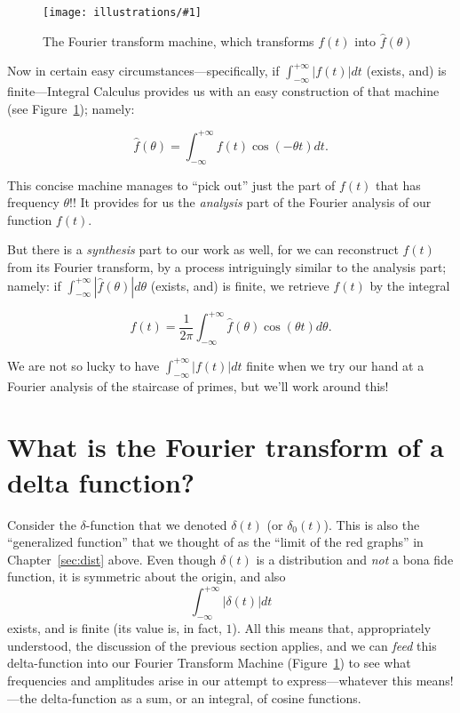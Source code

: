 \documentclass[openany]{book}
\newcommand{\ill}[3]{%
   \begin{figure}[H]%
   \vspace{-2ex}
   \centering%
   \texttt{[image: illustrations/\#1]}%
   \caption{#3}%
   \vspace{-2ex}
    \end{figure}}
\theoremstyle{plain}
\theoremstyle{definition}
\begin{document}
{\ill{fourier_machine}{.6}{The Fourier transform machine, which transforms $f(t)$ into ${\hat f}(\theta)$\label{fig:fourier_machine}}


Now in certain easy circumstances---specifically, if
$\int_{-{\infty}}^{+{\infty}}|f(t)|dt$ (exists, and)
is finite---Integral Calculus provides us with an easy construction of that
machine (see Figure~\ref{fig:fourier_machine}); namely:

    $${\hat f}(\theta) = \int_{-{\infty}}^{+{\infty}}f(t)\cos(-\theta t)dt.$$


    This concise machine manages to ``pick out'' just the part of
    $f(t)$ that has frequency $\theta$!!  It provides for us the {\it
      analysis} part of the Fourier analysis of our function
    $f(t)$.

    But there is a {\it synthesis} part to our work as well,
    for we can reconstruct $f(t)$ from its Fourier transform, by a
    process intriguingly similar to the analysis part; namely:  if
$\int_{-{\infty}}^{+{\infty}}|{\hat f}(\theta)|d\theta$ (exists, and) is finite, we retrieve $f(t)$ by the integral

      $$f(t)  = {\frac{1}{2\pi}}\int_{-{\infty}}^{+{\infty}}{\hat f}(\theta)\cos(\theta t)d\theta.$$

      We are not so lucky to have
      $\int_{-{\infty}}^{+{\infty}}|f(t)|dt$ finite when we try our
      hand at a Fourier analysis of the staircase of primes, but we'll
      work around this!



\chapter[Fourier transform of delta]{What is the Fourier transform of a delta function?\label{sec:ftdelta}}

Consider the $\delta$-function that we denoted $\delta(t)$ (or
$\delta_0(t)$). This is also the ``generalized function'' that we
thought of as the ``limit of the red graphs'' in Chapter~\ref{sec:dist}
above. Even though $\delta(t)$ is a distribution and {\it not} a bona
fide function, it is symmetric about the origin, and
also $$\int_{-{\infty}}^{+{\infty}}|\delta(t)|dt$$ exists, and is
finite (its value is, in fact, $1$). All this means that,
appropriately understood, the discussion of the previous section
applies, and we can {\it feed} this delta-function into our Fourier
Transform Machine (Figure~\ref{fig:fourier_machine}) to see what
frequencies and amplitudes arise in our attempt to express---whatever
this means!---the delta-function as a sum, or an integral, of cosine
functions.


}
\end{document}
